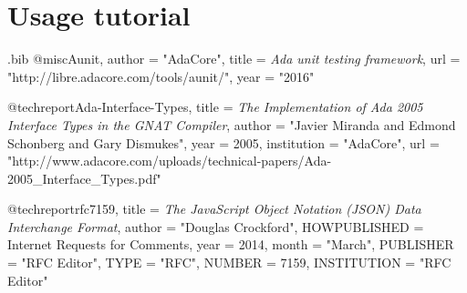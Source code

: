 \documentclass[12pt,a4paper]{article}
\begin{document}
\section{Usage tutorial}

\begin{filecontents}{\jobname.bib}
@misc{Aunit,
  author = "AdaCore",
  title = {\textit{Ada unit testing framework}},
  url = "http://libre.adacore.com/tools/aunit/",
  year = "2016"
}

@techreport{Ada-Interface-Types,
	title = {\textit{The Implementation of Ada 2005 Interface Types in the GNAT Compiler}},
	author = "Javier Miranda and Edmond Schonberg and Gary Dismukes",
	year = 2005,
	institution = "AdaCore",
	url = "http://www.adacore.com/uploads/technical-papers/Ada-2005_Interface_Types.pdf"
}

@techreport{rfc7159,
	title = {\textit{The JavaScript Object Notation (JSON) Data Interchange Format}},
	author = "Douglas Crockford",
	HOWPUBLISHED = {Internet Requests for Comments},
	year = 2014,
	month = "March",
	PUBLISHER = "{RFC Editor}",
	TYPE = "{RFC}",
	NUMBER = 7159,
	INSTITUTION = "{RFC Editor}"
}
\end{filecontents}



\end{document}
